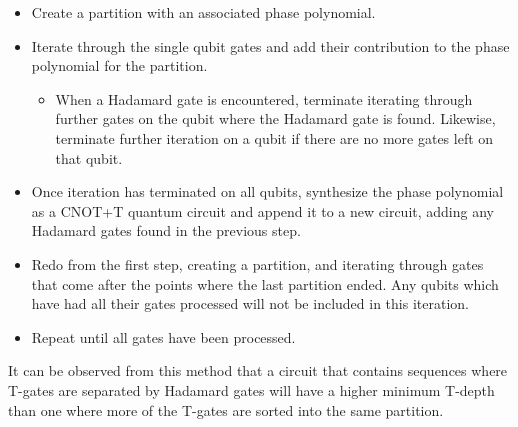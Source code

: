 \begin{itemize}
  \item Create a partition with an associated phase polynomial.
  \item Iterate through the single qubit gates and add their contribution to the phase polynomial
    for the partition.
    \begin{itemize}
    \item When a Hadamard gate is encountered, terminate iterating through further gates on the qubit
      where the Hadamard gate is found. Likewise, terminate further iteration on a qubit if there are
      no more gates left on that qubit.
    \end{itemize}
  \item Once iteration has terminated on all qubits, synthesize the phase polynomial as a CNOT+T quantum circuit
    and append it to a new circuit, adding any Hadamard gates found in the previous step.
  \item Redo from the first step, creating a partition, and iterating through gates that come after the
    points where the last partition ended. Any qubits which have had all their gates processed will not be
    included in this iteration.
  \item Repeat until all gates have been processed.
\end{itemize}

It can be observed from this method that a circuit that contains sequences where T-gates
are separated by Hadamard gates will have a higher minimum T-depth than one where more of
the T-gates are sorted into the same partition. 



